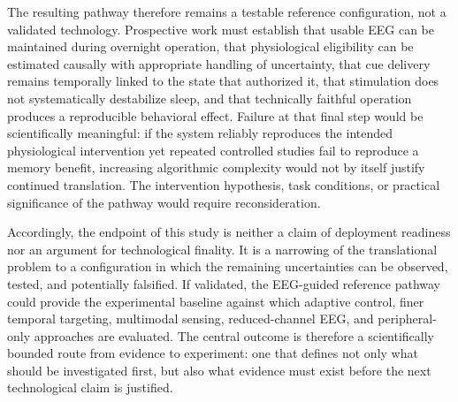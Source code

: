 The resulting pathway therefore remains a testable reference configuration,
not a validated technology. Prospective work must establish that usable EEG can
be maintained during overnight operation, that physiological eligibility can be
estimated causally with appropriate handling of uncertainty, that cue delivery
remains temporally linked to the state that authorized it, that stimulation does
not systematically destabilize sleep, and that technically faithful operation
produces a reproducible behavioral effect. Failure at that final step would be
scientifically meaningful: if the system reliably reproduces the intended
physiological intervention yet repeated controlled studies fail to reproduce a
memory benefit, increasing algorithmic complexity would not by itself justify
continued translation. The intervention hypothesis, task conditions, or
practical significance of the pathway would require reconsideration.

Accordingly, the endpoint of this study is neither a claim of deployment
readiness nor an argument for technological finality. It is a narrowing of the
translational problem to a configuration in which the remaining uncertainties
can be observed, tested, and potentially falsified. If validated, the EEG-guided
reference pathway could provide the experimental baseline against which
adaptive control, finer temporal targeting, multimodal sensing, reduced-channel
EEG, and peripheral-only approaches are evaluated. The central outcome is
therefore a scientifically bounded route from evidence to experiment: one that
defines not only what should be investigated first, but also what evidence must
exist before the next technological claim is justified.